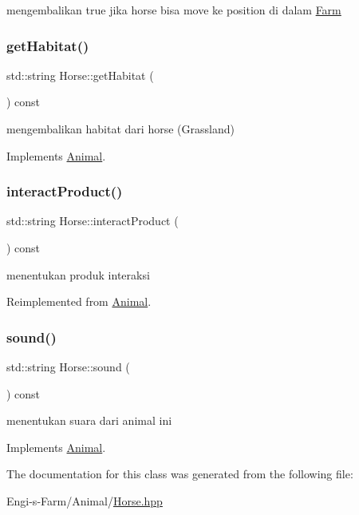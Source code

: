 mengembalikan true jika horse bisa move ke position di dalam \mbox{\hyperlink{class_farm}{Farm}} \mbox{\label{class_horse_af1b6722e6b3f0d206087c9f87a01f548}} 
\subsubsection{\texorpdfstring{getHabitat()}{getHabitat()}}
{\footnotesize\ttfamily std\+::string Horse\+::get\+Habitat (\begin{DoxyParamCaption}{ }\end{DoxyParamCaption}) const\hspace{0.3cm}{\ttfamily [virtual]}}

mengembalikan habitat dari horse (Grassland) 

Implements \mbox{\hyperlink{class_animal_a3de687fb42b792132a09176c4a0e2125}{Animal}}.

\mbox{\label{class_horse_aa6ff6a5a2cb301ccc853cf3c939ee070}} 
\subsubsection{\texorpdfstring{interactProduct()}{interactProduct()}}
{\footnotesize\ttfamily std\+::string Horse\+::interact\+Product (\begin{DoxyParamCaption}{ }\end{DoxyParamCaption}) const\hspace{0.3cm}{\ttfamily [virtual]}}

menentukan produk interaksi 

Reimplemented from \mbox{\hyperlink{class_animal_a8e99d809fbff9cea27dee5a785932dc6}{Animal}}.

\mbox{\label{class_horse_ae1a6e7e8d7e887b875dcfdad9b0fb3b5}} 
\subsubsection{\texorpdfstring{sound()}{sound()}}
{\footnotesize\ttfamily std\+::string Horse\+::sound (\begin{DoxyParamCaption}{ }\end{DoxyParamCaption}) const\hspace{0.3cm}{\ttfamily [virtual]}}

menentukan suara dari animal ini 

Implements \mbox{\hyperlink{class_animal_aca8216576b21b87f761a34686a4968a8}{Animal}}.



The documentation for this class was generated from the following file\+:\begin{DoxyCompactItemize}
\item 
Engi-\/s-\/\+Farm/\+Animal/\mbox{\hyperlink{_horse_8hpp}{Horse.\+hpp}}\end{DoxyCompactItemize}
